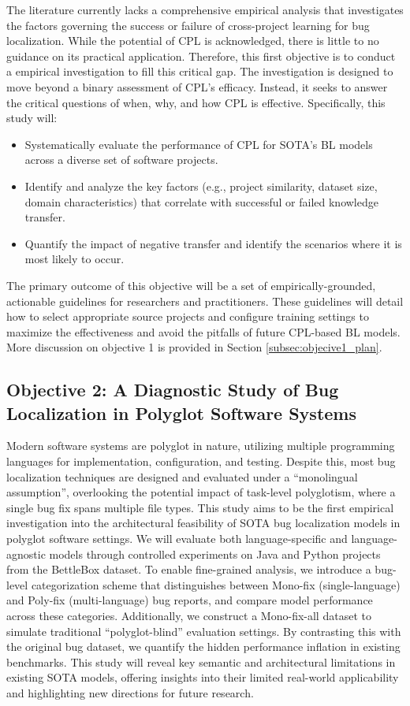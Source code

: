 \documentclass[12pt,table,xcdraw]{article}
\begin{document}
The literature currently lacks a comprehensive empirical analysis that investigates the factors governing the success or failure of cross-project learning for bug localization. While the potential of CPL is acknowledged, there is little to no guidance on its practical application. Therefore, this first objective is to conduct a empirical investigation to fill this critical gap. The investigation is designed to move beyond a binary assessment of CPL's efficacy. Instead, it seeks to answer the critical questions of when, why, and how CPL is effective. Specifically, this study will:
\begin{itemize}
    \item Systematically evaluate the performance of CPL for SOTA's BL models across a diverse set of software projects.
    \item Identify and analyze the key factors (e.g., project similarity, dataset size, domain characteristics) that correlate with successful or failed knowledge transfer.
    \item Quantify the impact of negative transfer and identify the scenarios where it is most likely to occur.
\end{itemize}

The primary outcome of this objective will be a set of empirically-grounded, actionable guidelines for researchers and practitioners. These guidelines will detail how to select appropriate source projects and configure training settings to maximize the effectiveness and avoid the pitfalls of future CPL-based BL models. More discussion on objective 1 is provided in Section \ref{subsec:objecive1_plan}.

\subsection{Objective 2: A Diagnostic Study of Bug Localization in Polyglot Software Systems}
\label{subsec: obj2}
Modern software systems are polyglot in nature, utilizing multiple programming languages for implementation, configuration, and testing. Despite this, most bug localization techniques are designed and evaluated under a ``monolingual assumption'', overlooking the potential impact of task-level polyglotism, where a single bug fix spans multiple file types. This study aims to be the first empirical investigation into the architectural feasibility of SOTA bug localization models in polyglot software settings. We will evaluate both language-specific and language-agnostic models through controlled experiments on Java and Python projects from the BettleBox dataset. To enable fine-grained analysis, we introduce a bug-level categorization scheme that distinguishes between Mono-fix (single-language) and Poly-fix (multi-language) bug reports, and compare model performance across these categories. Additionally, we construct a Mono-fix-all dataset to simulate traditional ``polyglot-blind'' evaluation settings. By contrasting this with the original bug dataset, we quantify the hidden performance inflation in existing benchmarks. This study will reveal key semantic and architectural limitations in existing SOTA models, offering insights into their limited real-world applicability and highlighting new directions for future research.
\end{document}
